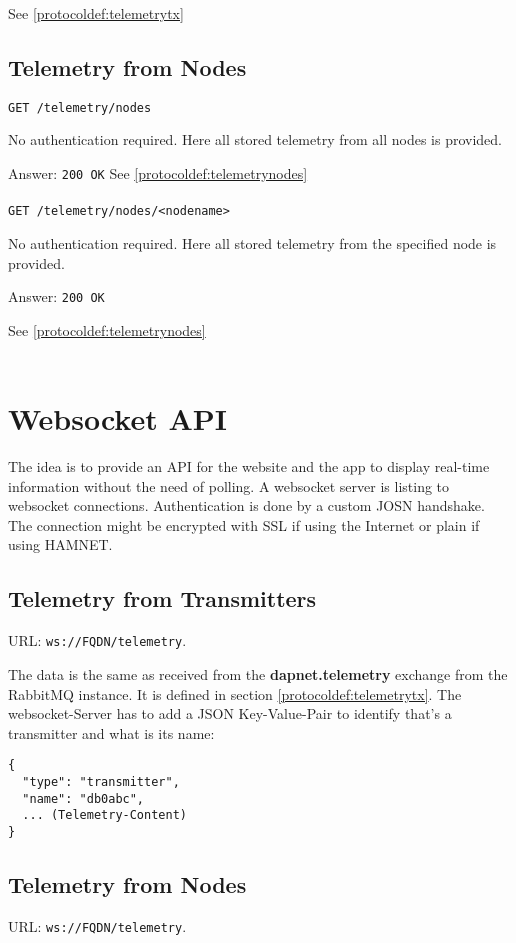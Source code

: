 See \ref{protocoldef:telemetrytx}

\subsection{Telemetry from Nodes}

\texttt{GET /telemetry/nodes}

No authentication required. Here all stored telemetry from all nodes is provided.

Answer:
\texttt{200 OK}
See \ref{protocoldef:telemetrynodes}\\\\

\texttt{GET /telemetry/nodes/<nodename>}

No authentication required. Here all stored telemetry from the specified node is provided.

Answer:
\texttt{200 OK}

See \ref{protocoldef:telemetrynodes}\\\\


\section{Websocket API}
\label{protocoldef:websocketapi}
The idea is to provide an API for the website and the app to display real-time
information without the need of polling. A websocket server is listing to
websocket connections. Authentication is done by a custom JOSN handshake. The
connection might be encrypted with SSL if using the Internet or plain if using
HAMNET.

\subsection{Telemetry from Transmitters}
\label{protcoldef:websocketapi:telemetrytx}
URL: \texttt{ws://FQDN/telemetry}.

The data is the same as received from the \textbf{dapnet.telemetry} exchange
from the RabbitMQ instance. It is defined in section
\ref{protocoldef:telemetrytx}.
The websocket-Server has to add a JSON Key-Value-Pair to identify that's a transmitter and what is its name:

\begin{lstlisting}
{
  "type": "transmitter",
  "name": "db0abc",
  ... (Telemetry-Content)
}
\end{lstlisting}

\subsection{Telemetry from Nodes}
\label{protcoldef:websocketapi:telemetrynodes}
URL: \texttt{ws://FQDN/telemetry}.

